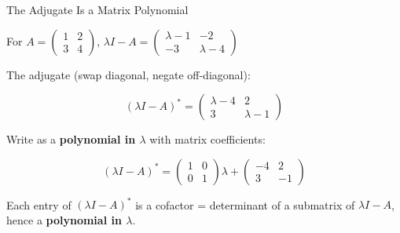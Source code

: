 \documentclass[10pt]{beamer}
\theoremstyle{definition}
\newcommand{\x}[1]{\alert{\textbf{#1}}}
\begin{document}
\begin{frame}{The Adjugate Is a Matrix Polynomial}

For $A = \begin{pmatrix}1&2\\3&4\end{pmatrix}$, \quad
$\lambda I - A = \begin{pmatrix} \lambda-1 & -2 \\ -3 & \lambda-4 \end{pmatrix}$

\vfill

The adjugate (swap diagonal, negate off-diagonal):

$$(\lambda I - A)^* = \begin{pmatrix} \lambda-4 & 2 \\ 3 & \lambda-1 \end{pmatrix}$$

\vfill

Write as a \x{polynomial in $\lambda$} with matrix coefficients:

$$(\lambda I - A)^* = \begin{pmatrix}1&0\\0&1\end{pmatrix}\lambda + \begin{pmatrix}-4&2\\3&-1\end{pmatrix}$$

\vfill

Each entry of $(\lambda I-A)^*$ is a cofactor = determinant of a submatrix
of $\lambda I - A$, hence a \x{polynomial in $\lambda$}.

\vfill
\end{frame}
\end{document}
